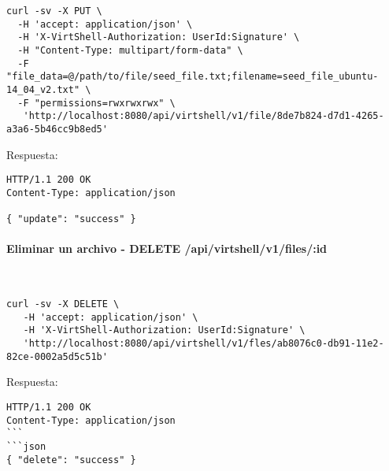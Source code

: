 \begin{lstlisting}[style=json]
curl -sv -X PUT \
  -H 'accept: application/json' \
  -H 'X-VirtShell-Authorization: UserId:Signature' \
  -H "Content-Type: multipart/form-data" \
  -F "file_data=@/path/to/file/seed_file.txt;filename=seed_file_ubuntu-14_04_v2.txt" \
  -F "permissions=rwxrwxrwx" \
   'http://localhost:8080/api/virtshell/v1/file/8de7b824-d7d1-4265-a3a6-5b46cc9b8ed5'
\end{lstlisting}

\vspace{1cm}
Respuesta:
\vspace{1cm}

\begin{lstlisting}[style=json]
HTTP/1.1 200 OK
Content-Type: application/json

{ "update": "success" }
\end{lstlisting}


\paragraph{Eliminar un archivo - DELETE /api/virtshell/v1/files/:id} ~\\

\begin{lstlisting}[style=json]
curl -sv -X DELETE \
   -H 'accept: application/json' \
   -H 'X-VirtShell-Authorization: UserId:Signature' \
   'http://localhost:8080/api/virtshell/v1/fles/ab8076c0-db91-11e2-82ce-0002a5d5c51b'
\end{lstlisting}

\vspace{1cm}
Respuesta:
\vspace{1cm}

\begin{lstlisting}[style=json]
HTTP/1.1 200 OK
Content-Type: application/json
```
```json
{ "delete": "success" }
\end{lstlisting}
